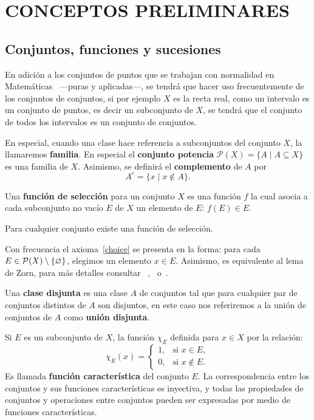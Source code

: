 \chapter{CONCEPTOS PRELIMINARES}

\section{Conjuntos, funciones y sucesiones}

En adición a los conjuntos de puntos que se trabajan con normalidad
en Matemáticas ~---puras y aplicadas---, se tendrá que hacer uso
frecuentemente de los conjuntos de conjuntos, si por ejemplo $X$ es
la recta real, como un intervalo es un conjunto de puntos, es decir
un subconjunto de $X$, se tendrá que el conjunto de todos los
intervalos es un conjunto de conjuntos.

En especial, cuando una clase hace referencia a subconjuntos del
conjunto $X$, la llamaremos \textbf{familia}. En especial el
\textbf{conjunto potencia} $\mathcal{P} (X)=\{A\mid A\subseteq X\}$
es una familia de $X$. Asimismo, se definirá el \textbf{complemento}
de $A$ por \[A^c=\{x\mid x\notin A\}.\]

\begin{defn}\label{dfcp28} Una \textbf{función de selección}
para un conjunto $X$ es una función $f$ la cual asocia a cada
subconjunto no vacío $E$ de $X$ un elemento de $E$: $f(E)\in E$.
\end{defn}

\begin{axm}[de selección]\label{choice} Para cualquier conjunto
existe una función de selección.
\end{axm}

\begin{rem} Con frecuencia el axioma~\ref{choice} se presenta en
la forma: para cada $E\in \mathcal{P}(X)\setminus\{\varnothing\}$,
elegimos un elemento $x\in E$. Asimismo, es equivalente al lema de
Zorn, para más detalles consultar
~\cite[p. 97]{Halmo},~\cite[p. 338]{Haus} o~\cite[p. 14]{Hewit}.
\end{rem}

Una \textbf{clase disjunta} es una clase {\boldmath $A$} de
conjuntos tal que para cualquier par de conjuntos distintos de
{\boldmath $A$} son disjuntos, en este caso nos referiremos a la
unión de conjuntos de {\boldmath $A$} como \textbf{unión disjunta}.

Si $E$ es un subconjunto de $X$, la función $\chi _E$ definida para
$x\in X$ por la relación:
\begin{equation}\label{eq0}
    \chi_E(x)= \begin{cases}
    1, & \mbox{si } x\in E, \\
    0, & \mbox{si } x\notin E.
    \end{cases}
\end{equation}Es llamada \textbf{función característica}
del conjunto $E$. La correspondencia entre los conjuntos y sus
funciones características es inyectiva, y todas las propiedades de
conjuntos y operaciones entre conjuntos pueden ser expresadas por
medio de funciones características. 

